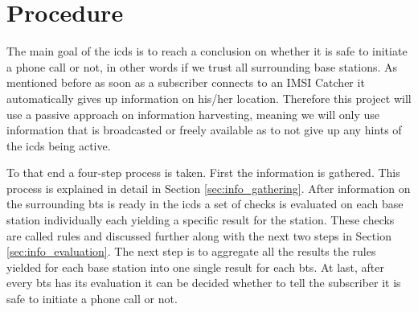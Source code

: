 \section{Procedure}
The main goal of the \gls{icds} is to reach a conclusion on whether it is safe to initiate a phone call or not, in other words if we trust all surrounding base stations.
As mentioned before as soon as a subscriber connects to an IMSI Catcher it automatically gives up information on his/her location.
Therefore this project will use a passive approach on information harvesting, meaning we will only use information that is broadcasted or freely available as to not give up any hints of the \gls{icds} being active.

To that end a four-step process is taken.
First the information is gathered.
This process is explained in detail in Section \ref{sec:info_gathering}.
After information on the surrounding \gls{bts} is ready in the \gls{icds} a set of checks is evaluated on each base station individually each yielding a specific result for the station.
These checks are called rules and discussed further along with the next two steps in Section \ref{sec:info_evaluation}.
The next step is to aggregate all the results the rules yielded for each base station into one single result for each \gls{bts}.
At last, after every \gls{bts} has its evaluation it can be decided whether to tell the subscriber it is safe to initiate a phone call or not.

